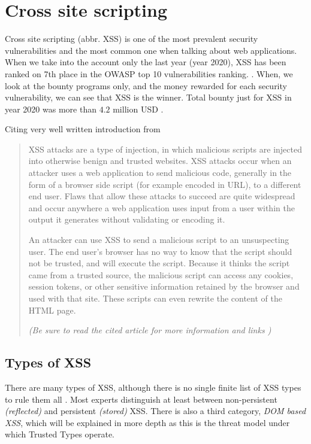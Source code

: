 \chapter{Cross site scripting}

\label{chapter:xss} %

Cross site scripting (abbr. XSS) is one of the most prevalent security vulnerabilities and the most
common one when talking about web applications. When we take into the account only the last year
(year 2020), XSS has been ranked on 7th place in the OWASP top 10 vulnerabilities ranking.
\cite{owasp_top_ten_vulns}. When, we look at the bounty programs only, and the money rewarded for
each security vulnerability, we can see that XSS is the winner. Total bounty just for XSS in year
2020 was more than $4.2$ million USD \cite{top_ten_rewarded_vulns}.

Citing very well written introduction from \cite{xss_owasp_intro}

\begin{quotation}
  XSS attacks are a type of injection, in which malicious scripts are injected into otherwise benign
  and trusted websites. XSS attacks occur when an attacker uses a web application to send malicious
  code, generally in the form of a browser side script (for example encoded in URL), to a different
  end user. Flaws that allow these attacks to succeed are quite widespread and occur anywhere a web
  application uses input from a user within the output it generates without validating or encoding
  it.

  An attacker can use XSS to send a malicious script to an unsuspecting user. The end user’s browser
  has no way to know that the script should not be trusted, and will execute the script. Because it
  thinks the script came from a trusted source, the malicious script can access any cookies, session
  tokens, or other sensitive information retained by the browser and used with that site. These
  scripts can even rewrite the content of the HTML page.

  \emph{(Be sure to read the cited article for more information and links \cite{xss_owasp_intro})}
\end{quotation}

\section{Types of XSS}
\label{chapter:xss:types}

There are many types of XSS, although there is no single finite list of XSS types to rule them all
\cite{lotr_fellowship}. Most experts distinguish at least between non-persistent \emph{(reflected)}
and persistent \emph{(stored)} XSS. There is also a third category, \emph{DOM based XSS}, which will
be explained in more depth as this is the threat model under which Trusted Types operate.

